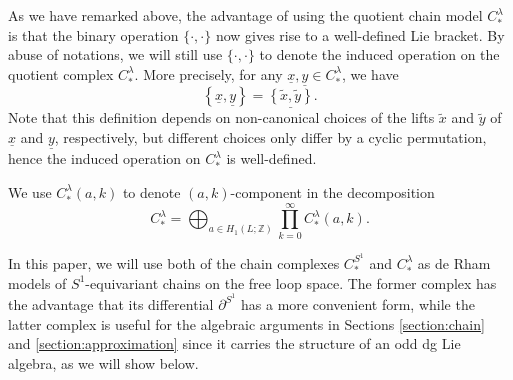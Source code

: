 \documentclass[a4paper]{article}
\numberwithin{equation}{section}
\begin{document}
As we have remarked above, the advantage of using the quotient chain model $C_\ast^\lambda$ is that the binary operation $\{\cdot,\cdot\}$ now gives rise to a well-defined Lie bracket. By abuse of notations, we will still use $\{\cdot,\cdot\}$ to denote the induced operation on the quotient complex $C_\ast^\lambda$. More precisely, for any $\underline{x},\underline{y}\in C_\ast^\lambda$, we have
\begin{equation}
\left\{\underline{x},\underline{y}\right\}=\underline{\left\{\tilde{x},\tilde{y}\right\}}.
\end{equation}
Note that this definition depends on non-canonical choices of the lifts $\tilde{x}$ and $\tilde{y}$ of $\underline{x}$ and $\underline{y}$, respectively, but different choices only differ by a cyclic permutation, hence the induced operation on $C_\ast^\lambda$ is well-defined.

We use $C_\ast^\lambda(a,k)$ to denote $(a,k)$-component in the decomposition
\begin{equation}
C_\ast^\lambda=\bigoplus_{a\in H_1(L;\mathbb{Z})}\prod_{k=0}^\infty C_\ast^\lambda(a,k).
\end{equation} 

In this paper, we will use both of the chain complexes $C_\ast^{S^1}$ and $C_\ast^\lambda$ as de Rham models of $S^1$-equivariant chains on the free loop space. The former complex has the advantage that its differential $\partial^{S^1}$ has a more convenient form, while the latter complex is useful for the algebraic arguments in Sections \ref{section:chain} and \ref{section:approximation} since it carries the structure of an odd dg Lie algebra, as we will show below.
\end{document}
